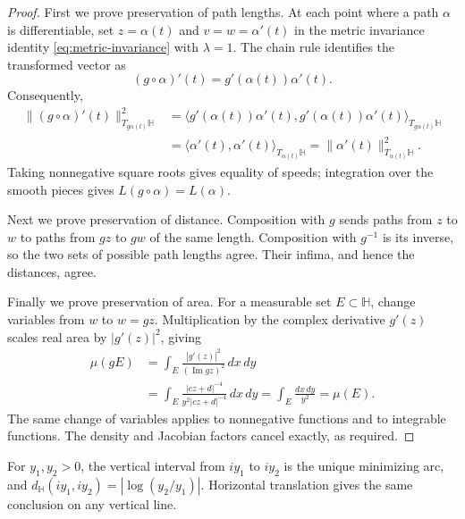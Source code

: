 \begin{proof}
First we prove preservation of path lengths. At each point where a path $\alpha$ is differentiable, set $z=\alpha(t)$ and $v=w=\alpha'(t)$ in the metric invariance identity \eqref{eq:metric-invariance} with $\lambda=1$. The chain rule identifies the transformed vector as
\[
 (g\circ\alpha)'(t)=g'(\alpha(t))\alpha'(t).
\]
Consequently,
\[
 \begin{aligned}
 \|(g\circ\alpha)'(t)\|_{T_{g\alpha(t)}\mathbb H}^2
 &=\bigl\langle g'(\alpha(t))\alpha'(t),
                 g'(\alpha(t))\alpha'(t)\bigr\rangle_{T_{g\alpha(t)}\mathbb H}\\
 &=\langle\alpha'(t),\alpha'(t)\rangle_{T_{\alpha(t)}\mathbb H}
 =\|\alpha'(t)\|_{T_{\alpha(t)}\mathbb H}^2.
 \end{aligned}
\]
Taking nonnegative square roots gives equality of speeds; integration over the smooth pieces gives $L(g\circ\alpha)=L(\alpha)$.

Next we prove preservation of distance. Composition with $g$ sends paths from $z$ to $w$ to paths from $gz$ to $gw$ of the same length. Composition with $g^{-1}$ is its inverse, so the two sets of possible path lengths agree. Their infima, and hence the distances, agree.

Finally we prove preservation of area. For a measurable set $E\subset\mathbb H$, change variables from $w$ to $w=gz$. Multiplication by the complex derivative $g'(z)$ scales real area by $|g'(z)|^2$, giving
\[
 \begin{aligned}
 \mu(gE)
 &=\int_E\frac{|g'(z)|^2}{(\operatorname{Im}gz)^2}\,dx\,dy\\
 &=\int_E\frac{|cz+d|^{-4}}{y^2|cz+d|^{-4}}\,dx\,dy
 =\int_E\frac{dx\,dy}{y^2}=\mu(E).
 \end{aligned}
\]
The same change of variables applies to nonnegative functions and to integrable functions. The density and Jacobian factors cancel exactly, as required.
\end{proof}

\begin{lemma}\label{hyperbolic.vertical-geodesics}
For $y_1,y_2>0$, the vertical interval from $iy_1$ to $iy_2$ is the unique minimizing arc, and $d_{\mathbb H}(iy_1,iy_2)=|\log(y_2/y_1)|$. Horizontal translation gives the same conclusion on any vertical line.
\end{lemma}

